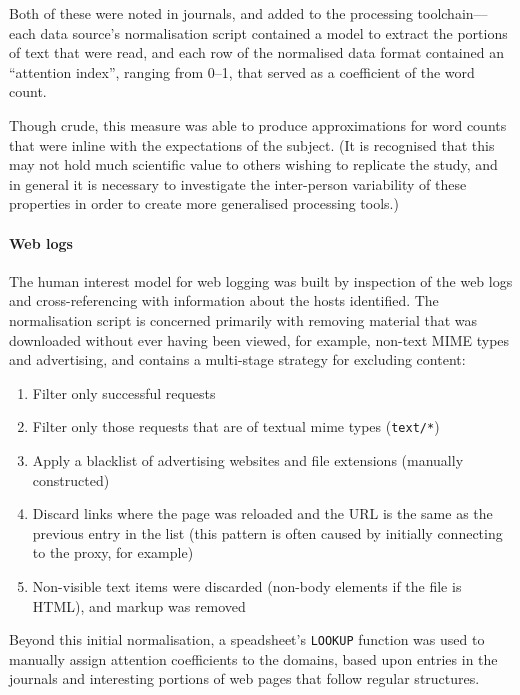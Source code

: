 Both of these were noted in journals, and added to the processing toolchain---each data source's normalisation script contained a model to extract the portions of text that were read, and each row of the normalised data format contained an ``attention index'', ranging from 0--1, that served as a coefficient of the word count.

Though crude, this measure was able to produce approximations for word counts that were inline with the expectations of the subject.  (It is recognised that this may not hold much scientific value to others wishing to replicate the study, and in general it is necessary to investigate the inter-person variability of these properties in order to create more generalised processing tools.)


\paragraph{Web logs}
The human interest model for web logging was built by inspection of the web logs and cross-referencing with information about the hosts identified.  The normalisation script is concerned primarily with removing material that was downloaded without ever having been viewed, for example, non-text MIME types and advertising, and contains a multi-stage strategy for excluding content:

\begin{enumerate}
    \item Filter only successful requests
    \item Filter only those requests that are of textual mime types (\texttt{text/*})
    \item Apply a blacklist of advertising websites and file extensions (manually constructed)
    \item Discard links where the page was reloaded and the URL is the same as the previous entry in the list (this pattern is often caused by initially connecting to the proxy, for example)
    \item Non-visible text items were discarded (non-body elements if the file is HTML), and markup was removed
\end{enumerate}

Beyond this initial normalisation, a speadsheet's \texttt{LOOKUP} function was used to manually assign attention coefficients to the domains, based upon entries in the journals and interesting portions of web pages that follow regular structures.

